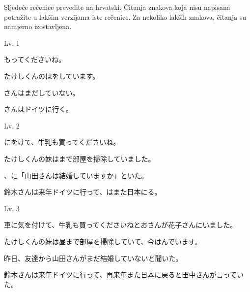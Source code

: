 
\author{Tomislav Mamić}

	
	\vspace{15pt}
	\noindent Sljedeće rečenice prevedite na hrvatski. Čitanja znakova koja nisu napisana potražite u lakšim verzijama iste rečenice. Za nekoliko lakših znakova, čitanja su namjerno izostavljena.

	\begin{mondai}{Lv. 1}
		\itemsep2pt
		\item {}も\hspace{12pt}ってくださいね。
		\item たけしくんのは\hspace{12pt}をしています。
		\item {}さんはまだしていない。
		\item {}さんはドイツに行く。
	\end{mondai}

	\begin{mondai}{Lv. 2}
		\itemsep2pt
		\item {}にをけて、牛乳も買ってくださいね。
		\item たけしくんの妹はまで部屋を掃除していました。
		\item {}、\hspace{5pt}に「山田さんは結婚していますか」といた。
		\item 鈴木さんは来年ドイツに行って、はまた日本にる。
	\end{mondai}

	\begin{mondai}{Lv. 3}
		\itemsep2pt
		\item 車に気を付けて、牛乳も買ってくださいねとおさんが花子さんにいました。
		\item たけしくんの妹は昼まで部屋を掃除していて、今はんでいます。
		\item 昨日、友達から山田さんがまだ結婚していないと聞いた。
		\item 鈴木さんは来年ドイツに行って、再来年また日本に戻ると田中さんが言っていた。
	\end{mondai}
